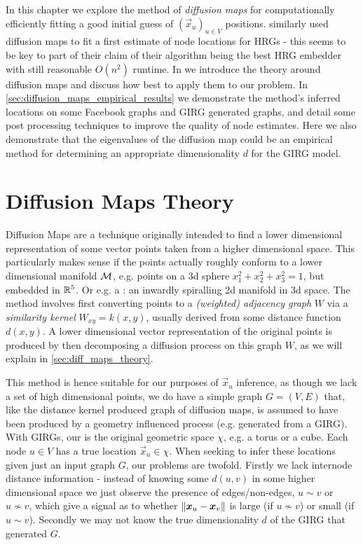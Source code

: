 In this chapter we explore the method of \textit{diffusion maps} for computationally efficiently fitting a good initial guess of $(\vec{x}_u)_{u \in V}$ positions. \cite{garcia2019mercator} similarly used diffusion maps to fit a first estimate of node locations for HRGs - this seems to be key to part of their claim of their algorithm being the best HRG embedder with still reasonable $O(n^2)$ runtime. In \label{sec:diff_maps_theory_major} we introduce the theory around diffusion maps and discuss how best to apply them to our problem. In \cref{sec:diffusion_maps_empirical_results} we demonstrate the method's inferred locations on some Facebook graphs and GIRG generated graphs, and detail some post processing techniques to improve the quality of node estimates. Here we also demonstrate that the eigenvalues of the diffusion map could be an empirical method for determining an appropriate dimensionality $d$ for the GIRG model.

\section{Diffusion Maps Theory}
\label{sec:diff_maps_theory_major}
Diffusion Maps \cite{coifman2006diffusion} are a technique originally intended to find a lower dimensional representation of some vector points taken from a higher dimensional space. This particularly makes sense if the points actually roughly conform to a lower dimensional manifold $\mathcal{M}$, e.g. points on a 3d sphere $x_1^2 + x_2^2 + x_3^2 = 1$, but embedded in $\mathbb{R}^5$. Or e.g. a : an inwardly spiralling 2d manifold in 3d space. The method involves first converting points to a \textit{(weighted) adjacency graph} $W$ via a \textit{similarity kernel} $W_{xy} = k(x,y)$, usually derived from some distance function $d(x,y)$. A lower dimensional vector representation of the original points is produced by then decomposing a diffusion process on this graph $W$, as we will explain in \cref{sec:diff_maps_theory}.

This method is hence suitable for our purposes of $\vec{x}_u$ inference, as though we lack a set of high dimensional points, we do have a simple graph $G = (V,E)$ that, like the distance kernel produced graph of diffusion maps, is assumed to have been produced by a geometry influenced process (e.g. generated from a GIRG).
With GIRGs, our  is the original geometric space $\chi$, e.g. a torus or a cube.
Each node $u \in V$ has a true location $\vec{x}_u \in \chi$.
When seeking to infer these locations given just an input graph $G$, our problems are twofold. Firstly we lack internode distance information - instead of knowing some $d(u, v)$ in some higher dimensional space we just observe the presence of edges/non-edges, $u \sim v$ or $u \nsim v$, which give a signal as to whether $\left\lVert \bm{x}_u - \bm{x}_v\right\rVert$ is large (if $u \nsim v$) or small (if $u \sim v$). Secondly we may not know the true dimensionality $d$ of the GIRG that generated $G$.

